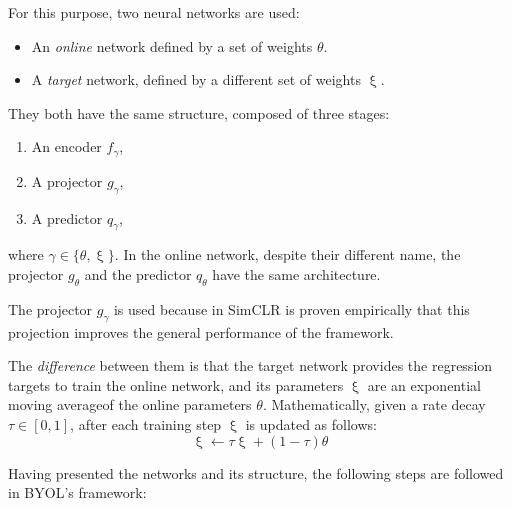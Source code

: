 For this purpose, two neural networks are used:
\begin{itemize}
\item An \emph{online} network defined by a set of weights $\theta$.

\item A \emph{target} network, defined by a different set of weights $\upxi$.
\end{itemize}

They both have the same structure, composed of three stages:
\begin{enumerate}
\item An encoder $f_\gamma$,
\item A projector $g_\gamma$,
\item A predictor $q_\gamma$,
\end{enumerate}
where $\gamma \in \{\theta,\upxi\}$. In the online network, despite their different name, the projector $g_\theta$ and the predictor $q_\theta$ have the same architecture.

\begin{remark}
The projector $g_\gamma$ is used because in SimCLR \citep{chen_simple_2020} is proven empirically that this projection improves the general performance of the framework.
\end{remark}

The \emph{difference} between them is that the target network provides the regression targets to train the online network, and its parameters $\upxi$ are an exponential moving average\footnotemark of the online parameters $\theta$. Mathematically, given a rate decay $\tau \in [0,1]$, after each training step $\upxi$ is updated as follows:
\[
\upxi \leftarrow \tau \upxi + (1-\tau)\theta    
\]


Having presented the networks and its structure, the following steps are followed in BYOL's framework:

